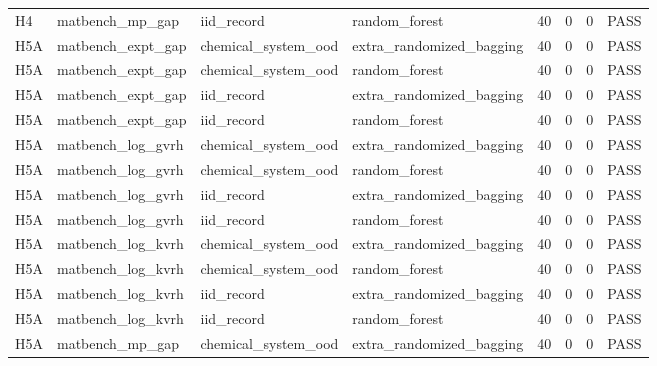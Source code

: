 \documentclass[10pt]{article}
\begin{document}
\begin{landscape}
\begin{longtable}{L{.32in}L{1.05in}L{1.2in}L{1.3in}L{.42in}L{.42in}L{.42in}L{.48in}}
H4 & matbench\_\allowbreak{}mp\_\allowbreak{}gap & iid\_\allowbreak{}record & random\_\allowbreak{}forest & 40 & 0 & 0 & PASS\\
H5A & matbench\_\allowbreak{}expt\_\allowbreak{}gap & chemical\_\allowbreak{}system\_\allowbreak{}ood & extra\_\allowbreak{}randomized\_\allowbreak{}bagging & 40 & 0 & 0 & PASS\\
H5A & matbench\_\allowbreak{}expt\_\allowbreak{}gap & chemical\_\allowbreak{}system\_\allowbreak{}ood & random\_\allowbreak{}forest & 40 & 0 & 0 & PASS\\
H5A & matbench\_\allowbreak{}expt\_\allowbreak{}gap & iid\_\allowbreak{}record & extra\_\allowbreak{}randomized\_\allowbreak{}bagging & 40 & 0 & 0 & PASS\\
H5A & matbench\_\allowbreak{}expt\_\allowbreak{}gap & iid\_\allowbreak{}record & random\_\allowbreak{}forest & 40 & 0 & 0 & PASS\\
H5A & matbench\_\allowbreak{}log\_\allowbreak{}gvrh & chemical\_\allowbreak{}system\_\allowbreak{}ood & extra\_\allowbreak{}randomized\_\allowbreak{}bagging & 40 & 0 & 0 & PASS\\
H5A & matbench\_\allowbreak{}log\_\allowbreak{}gvrh & chemical\_\allowbreak{}system\_\allowbreak{}ood & random\_\allowbreak{}forest & 40 & 0 & 0 & PASS\\
H5A & matbench\_\allowbreak{}log\_\allowbreak{}gvrh & iid\_\allowbreak{}record & extra\_\allowbreak{}randomized\_\allowbreak{}bagging & 40 & 0 & 0 & PASS\\
H5A & matbench\_\allowbreak{}log\_\allowbreak{}gvrh & iid\_\allowbreak{}record & random\_\allowbreak{}forest & 40 & 0 & 0 & PASS\\
H5A & matbench\_\allowbreak{}log\_\allowbreak{}kvrh & chemical\_\allowbreak{}system\_\allowbreak{}ood & extra\_\allowbreak{}randomized\_\allowbreak{}bagging & 40 & 0 & 0 & PASS\\
H5A & matbench\_\allowbreak{}log\_\allowbreak{}kvrh & chemical\_\allowbreak{}system\_\allowbreak{}ood & random\_\allowbreak{}forest & 40 & 0 & 0 & PASS\\
H5A & matbench\_\allowbreak{}log\_\allowbreak{}kvrh & iid\_\allowbreak{}record & extra\_\allowbreak{}randomized\_\allowbreak{}bagging & 40 & 0 & 0 & PASS\\
H5A & matbench\_\allowbreak{}log\_\allowbreak{}kvrh & iid\_\allowbreak{}record & random\_\allowbreak{}forest & 40 & 0 & 0 & PASS\\
H5A & matbench\_\allowbreak{}mp\_\allowbreak{}gap & chemical\_\allowbreak{}system\_\allowbreak{}ood & extra\_\allowbreak{}randomized\_\allowbreak{}bagging & 40 & 0 & 0 & PASS\\

\end{longtable}
\end{landscape}
\end{document}

